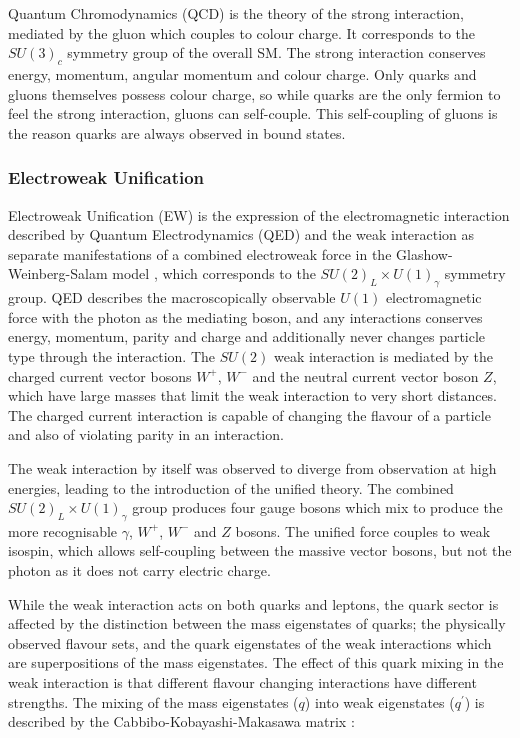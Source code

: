 		Quantum Chromodynamics (QCD) is the theory of the strong interaction, mediated by the gluon which couples to colour charge. It corresponds to the $SU(3)_c$ symmetry group of the overall SM. The strong interaction conserves energy, momentum, angular momentum and colour charge. Only quarks and gluons themselves possess colour charge, so while quarks are the only fermion to feel the strong interaction, gluons can self-couple. This self-coupling of gluons is the reason quarks are always observed in bound states.
		
		\subsubsection{Electroweak Unification} 
		
		Electroweak Unification (EW) is the expression of the electromagnetic interaction described by Quantum Electrodynamics (QED) and the weak interaction as separate manifestations of a combined electroweak force in the Glashow-Weinberg-Salam model \cite{gws-g, gws-w, gws-s}, which corresponds to the $SU(2)_L\times U(1)_\gamma$ symmetry group. QED describes the macroscopically observable $U(1)$ electromagnetic force  with the photon as the mediating boson, and any interactions conserves energy, momentum, parity and charge and additionally never changes particle type through the interaction. The $SU(2)$ weak interaction is mediated by the charged current vector bosons $W^+$, $W^-$ and the neutral current vector boson $Z$, which have large masses that limit the weak interaction to very short distances. The charged current interaction is capable of changing the flavour of a particle and also of violating parity in an interaction. 
		
		The weak interaction by itself was observed to diverge from observation at high energies, leading to the introduction of the unified theory. The combined  $SU(2)_L\times U(1)_\gamma$ group produces four gauge bosons which mix to produce the more recognisable $\gamma$, $W^+$, $W^-$  and $Z$ bosons. The unified force couples to weak isospin, which allows self-coupling between the massive vector bosons, but not the photon as it does not carry electric charge.
		
		While the weak interaction acts on both quarks and leptons, the quark sector is affected by the distinction between the mass eigenstates of quarks; the physically observed flavour sets, and the quark eigenstates of the weak interactions which are superpositions of the mass eigenstates. The effect of this quark mixing in the weak interaction is that different flavour changing interactions have different strengths. The mixing of the mass eigenstates ($q$) into weak eigenstates ($q^\prime$) is described by the Cabbibo-Kobayashi-Makasawa matrix \cite{ckm-c, ckm-km}:
		
